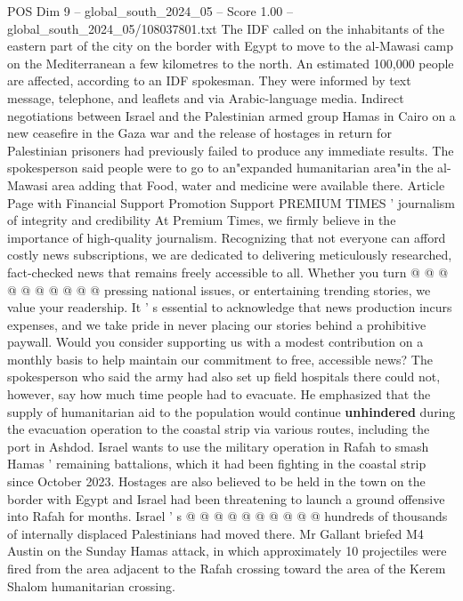 \begin{textsample}{POS Dim 9 – global\_south\_2024\_05 – Score 1.00 – global\_south\_2024\_05/108037801.txt}  \label{ex:f9_pos_125}
The IDF called on the inhabitants of the eastern part of the city on the border with Egypt to move to the al-Mawasi camp on the Mediterranean a few kilometres to the north.
An estimated 100,000 people are affected, according to an IDF spokesman.
They were informed by text message, telephone, and leaflets and via Arabic-language media.
Indirect negotiations between Israel and the Palestinian armed group Hamas in Cairo on a new ceasefire in the Gaza war and the release of hostages in return for Palestinian prisoners had previously failed to produce any immediate results.
The spokesperson said people were to go to an"expanded humanitarian area"in the al-Mawasi area adding that Food, water and medicine were available there.
Article Page with Financial Support Promotion Support PREMIUM TIMES ' journalism of integrity and credibility At Premium Times, we firmly believe in the importance of high-quality journalism.
Recognizing that not everyone can afford costly news subscriptions, we are dedicated to delivering meticulously researched, fact-checked news that remains freely accessible to all.
Whether you turn @ @ @ @ @ @ @ @ @ @ pressing national issues, or entertaining trending stories, we value your readership.
It ' s essential to acknowledge that news production incurs expenses, and we take pride in never placing our stories behind a prohibitive paywall.
Would you consider supporting us with a modest contribution on a monthly basis to help maintain our commitment to free, accessible news?
The spokesperson who said the army had also set up field hospitals there could not, however, say how much time people had to evacuate.
He emphasized that the supply of humanitarian aid to the population would continue \textbf{unhindered} during the evacuation operation to the coastal strip via various routes, including the port in Ashdod.
Israel wants to use the military operation in Rafah to smash Hamas ' remaining battalions, which it had been fighting in the coastal strip since October 2023.
Hostages are also believed to be held in the town on the border with Egypt and Israel had been threatening to launch a ground offensive into Rafah for months.
Israel ' s @ @ @ @ @ @ @ @ @ @ hundreds of thousands of internally displaced Palestinians had moved there.
Mr Gallant briefed M4 Austin on the Sunday Hamas attack, in which approximately 10 projectiles were fired from the area adjacent to the Rafah crossing toward the area of the Kerem Shalom humanitarian crossing.

\end{textsample}
